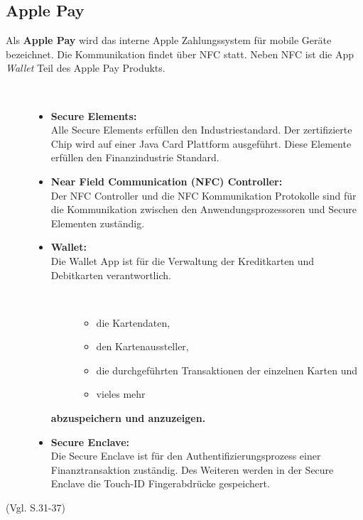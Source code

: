\subsection{Apple Pay}
\label{sec:ApplePay}
Als \textbf{Apple Pay} wird das interne Apple Zahlungssystem für mobile Geräte bezeichnet. Die Kommunikation findet über NFC statt. Neben NFC ist die App \textit{\glqq Wallet\grqq{}} Teil des Apple Pay Produkts.
\newpage
\begin{description}
\item[\parbox{\textwidth} {Folgende Komponenten gehören zu dem Apple Pay Produkt}]~\par
	\begin{itemize}
		\item \textbf{Secure Elements:} \\
        Alle Secure Elements erfüllen den Industriestandard. Der zertifizierte Chip wird auf einer Java Card Plattform ausgeführt. Diese Elemente erfüllen den Finanzindustrie Standard. 
 		\item \textbf{Near Field Communication (NFC) Controller:} \\
        Der NFC Controller und die NFC Kommunikation Protokolle sind für die Kommunikation zwischen den Anwendungsprozessoren und Secure Elementen zuständig.
 		\item \textbf{Wallet:} \\
        Die Wallet App ist für die Verwaltung der Kreditkarten und Debitkarten verantwortlich. 
            \begin{description}
                \item[\parbox{\textwidth} {Diese App ermöglicht es dem User}]~\par
                \begin{itemize}
                    \item die Kartendaten,
                    \item den Kartenaussteller,
                    \item die durchgeführten Transaktionen der einzelnen Karten und
                    \item vieles mehr
                \end{itemize}
            \end{description} 
        \textbf{abzuspeichern und anzuzeigen.}
        
 		\item \textbf{Secure Enclave:}\\
        Die Secure Enclave ist für den Authentifizierungsprozess einer Finanztransaktion zuständig. Des Weiteren werden in der Secure Enclave die Touch-ID Fingerabdrücke gespeichert.	
        \end{itemize}
\end{description}
(Vgl. \cite{Apple[4]} S.31-37)

